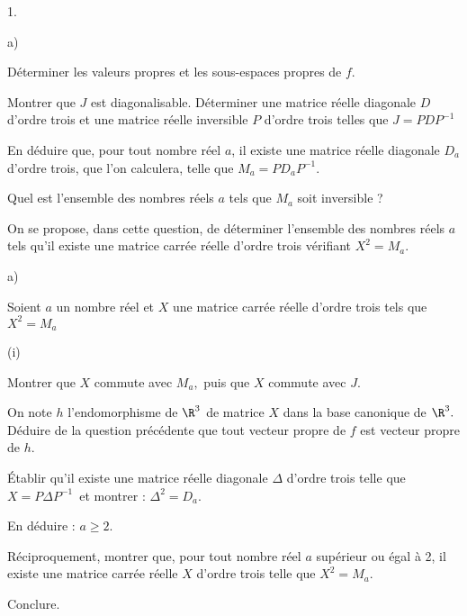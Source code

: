\documentclass[11pt]{article}%
\begin{document}
\begin{noliste}{1.}
 \setlength{\itemsep}{4mm}
\item 
\begin{noliste}{a)}
 \setlength{\itemsep}{2mm}
\item Déterminer les valeurs propres et les sous-espaces propres de
$f.$

\item Montrer que $J$ est diagonalisable. Déterminer une matrice réelle
diagonale $D$ d'ordre trois et une matrice réelle inversible $P$
d'ordre trois telles que $J = PDP^{-1}$

\item En déduire que, pour tout nombre réel $a$, il existe une
matrice réelle diagonale $D_{a}$ d'ordre trois, que l'on calculera,
telle que $M_{a} = PD_{a}P^{-1}.$

\item Quel est l'ensemble des nombres réels $a$ tels que $M_{a}$ soit
inversible ?
\end{noliste}

\item On se propose, dans cette question, de déterminer l'ensemble des
nombres réels $a$ tels qu'il existe une matrice carrée réelle
d'ordre trois vérifiant $X^{2} = M_{a}.$

\begin{noliste}{a)}
 \setlength{\itemsep}{2mm}
\item Soient $a$ un nombre réel et $X$ une matrice carrée réelle
d'ordre trois tels que $X^{2} = M_{a}$

\begin{nonoliste}{(i)}
\item Montrer que $X$ commute avec $M_{a},$ puis que $X$ commute avec
$J.$

\item On note $h$ l'endomorphisme de $\R^{3}$ de matrice $X$ dans la
base canonique de $\R^{3}.$ Déduire de la question précédente que tout
vecteur propre de $f$ est vecteur propre de $h.$

\item Établir qu'il existe une matrice réelle diagonale $\Delta $
d'ordre trois telle que $X = P\Delta P^{-1}$\ et montrer : $\Delta ^{2}
= D_{a}.$

\item En déduire : $a\geq 2.$
\end{nonoliste}

\item Réciproquement, montrer que, pour tout nombre réel $a$ supérieur
ou égal à 2, il existe une matrice carrée réelle $X$
d'ordre trois telle que $X^{2} = M_{a}.$

\item Conclure.
\end{noliste}
\end{noliste}
\end{document}
